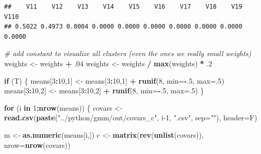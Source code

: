 \documentclass[]{article}
\newenvironment{Shaded}{\begin{snugshade}}{\end{snugshade}}
\newcommand{\CommentTok}[1]{\textcolor[rgb]{0.56,0.35,0.01}{\textit{#1}}}
\newcommand{\ControlFlowTok}[1]{\textcolor[rgb]{0.13,0.29,0.53}{\textbf{#1}}}
\newcommand{\DataTypeTok}[1]{\textcolor[rgb]{0.13,0.29,0.53}{#1}}
\newcommand{\DecValTok}[1]{\textcolor[rgb]{0.00,0.00,0.81}{#1}}
\newcommand{\FloatTok}[1]{\textcolor[rgb]{0.00,0.00,0.81}{#1}}
\newcommand{\KeywordTok}[1]{\textcolor[rgb]{0.13,0.29,0.53}{\textbf{#1}}}
\newcommand{\NormalTok}[1]{#1}
\newcommand{\OperatorTok}[1]{\textcolor[rgb]{0.81,0.36,0.00}{\textbf{#1}}}
\newcommand{\StringTok}[1]{\textcolor[rgb]{0.31,0.60,0.02}{#1}}
\begin{document}
\begin{verbatim}
##    V11    V12    V13    V14    V15    V16    V17    V18    V19   V110 
## 0.5022 0.4973 0.0004 0.0000 0.0000 0.0000 0.0000 0.0000 0.0000 0.0000
\end{verbatim}

\begin{Shaded}
\begin{Highlighting}[]
\CommentTok{# add constant to visualize all clusters (even the ones we really small weights)}
\NormalTok{weights <-}\StringTok{ }\NormalTok{weights }\OperatorTok{+}\StringTok{ }\FloatTok{.04}
\NormalTok{weights <-}\StringTok{ }\NormalTok{weights }\OperatorTok{/}\StringTok{ }\KeywordTok{max}\NormalTok{(weights) }\OperatorTok{*}\StringTok{ }\FloatTok{.2}

\ControlFlowTok{if}\NormalTok{ (T) \{}
\NormalTok{  means[}\DecValTok{3}\OperatorTok{:}\DecValTok{10}\NormalTok{,}\DecValTok{1}\NormalTok{] <-}\StringTok{ }\NormalTok{means[}\DecValTok{3}\OperatorTok{:}\DecValTok{10}\NormalTok{,}\DecValTok{1}\NormalTok{] }\OperatorTok{+}\StringTok{ }\KeywordTok{runif}\NormalTok{(}\DecValTok{8}\NormalTok{, }\DataTypeTok{min=}\OperatorTok{-}\NormalTok{.}\DecValTok{5}\NormalTok{, }\DataTypeTok{max=}\NormalTok{.}\DecValTok{5}\NormalTok{)}
\NormalTok{  means[}\DecValTok{3}\OperatorTok{:}\DecValTok{10}\NormalTok{,}\DecValTok{2}\NormalTok{] <-}\StringTok{ }\NormalTok{means[}\DecValTok{3}\OperatorTok{:}\DecValTok{10}\NormalTok{,}\DecValTok{2}\NormalTok{] }\OperatorTok{+}\StringTok{ }\KeywordTok{runif}\NormalTok{(}\DecValTok{8}\NormalTok{, }\DataTypeTok{min=}\OperatorTok{-}\NormalTok{.}\DecValTok{5}\NormalTok{, }\DataTypeTok{max=}\NormalTok{.}\DecValTok{5}\NormalTok{)}
\NormalTok{\}}

\ControlFlowTok{for}\NormalTok{ (i }\ControlFlowTok{in} \DecValTok{1}\OperatorTok{:}\KeywordTok{nrow}\NormalTok{(means)) \{}
\NormalTok{  covars <-}\StringTok{ }\KeywordTok{read.csv}\NormalTok{(}\KeywordTok{paste}\NormalTok{(}\StringTok{"../python/gmm/out/covars_c"}\NormalTok{, i}\DecValTok{-1}\NormalTok{, }\StringTok{".csv"}\NormalTok{, }\DataTypeTok{sep=}\StringTok{""}\NormalTok{),}
                     \DataTypeTok{header=}\NormalTok{F)}

\NormalTok{  m <-}\StringTok{ }\KeywordTok{as.numeric}\NormalTok{(means[i,])}
\NormalTok{  c <-}\StringTok{ }\KeywordTok{matrix}\NormalTok{(}\KeywordTok{rev}\NormalTok{(}\KeywordTok{unlist}\NormalTok{(covars)), }\DataTypeTok{nrow=}\KeywordTok{nrow}\NormalTok{(covars))}
  

\end{Highlighting}
\end{Shaded}
\end{document}
